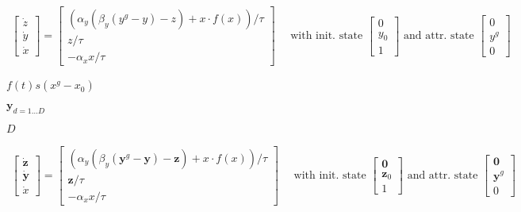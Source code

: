\documentclass{article}
\begin{document}
\begin{eqnarray*} \left[ \begin{array}{l} {\dot{z}} \\ {\dot{y}} \\ {\dot{x}} \end{array} \right] = \left[ \begin{array}{l} (\alpha_y (\beta_y({y}^{g}-{y})-{z}) + x\cdot f(x))/\tau \\ {z}/\tau \\ -\alpha_x x/\tau \end{array} \right] \mbox{~~~~with init. state~} \left[ \begin{array}{l} 0 \\ y_0 \\ 1 \end{array} \right] \mbox{~and attr. state~} \left[ \begin{array}{l} {0} \\ {y}^g \\ 0 \end{array} \right] \end{eqnarray*}
\pagebreak

$ f(t)s(x^g-x_0) $
\pagebreak

$ {\mathbf{y}}_{d=1\dots D}$
\pagebreak

$ D $
\pagebreak

\begin{eqnarray*} \left[ \begin{array}{l} {\dot{\mathbf{z}}} \\ {\dot{\mathbf{y}}} \\ {\dot{x}} \end{array} \right] = \left[ \begin{array}{l} (\alpha_y (\beta_y({\mathbf{y}}^{g}-\mathbf{y})-\mathbf{z}) + x\cdot f(x))/\tau \\ \mathbf{z}/\tau \\ -\alpha_x x/\tau \end{array} \right] \mbox{~~~~with init. state~} \left[ \begin{array}{l} \mathbf{0} \\ \mathbf{z}_0 \\ 1 \end{array} \right] \mbox{~and attr. state~} \left[ \begin{array}{l} \mathbf{0} \\ \mathbf{y}^g \\ 0 \end{array} \right] \end{eqnarray*}
\pagebreak
\end{document}

